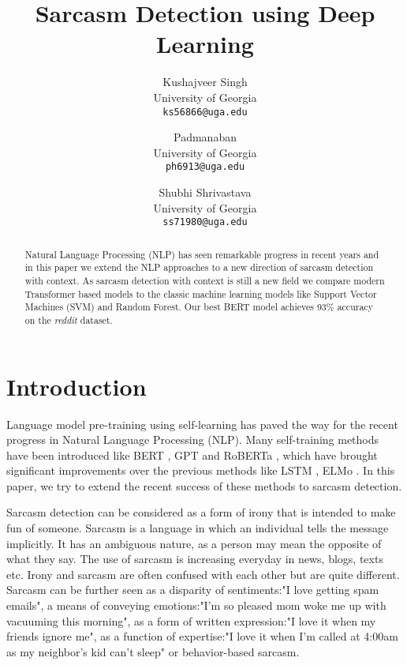 \documentclass[10pt,twocolumn,letterpaper]{article}
\begin{document}
\title{Sarcasm Detection using Deep Learning}
\author{
    Kushajveer Singh\\
    University of Georgia\\
    {\tt\small ks56866@uga.edu}
    \and
    Padmanaban\\
    University of Georgia\\
    {\tt\small ph6913@uga.edu}
    \and
    Shubhi Shrivastava\\
    University of Georgia\\
    {\tt\small ss71980@uga.edu}
}
\maketitle

\begin{abstract}
    Natural Language Processing (NLP) has seen remarkable progress in recent years and in this paper we extend the NLP approaches to a new direction of sarcasm detection with context. As sarcasm detection with context is still a new field we compare modern Transformer based models to the classic machine learning models like Support Vector Machines (SVM) and Random Forest. Our best BERT model achieves 93\% accuracy on the \textit{reddit} dataset.
\end{abstract}

\section{Introduction}
\label{sec:intro}

Language model pre-training using self-learning has paved the way for the recent progress in Natural Language Processing (NLP). Many self-training methods have been introduced like BERT \cite{paper_01}, GPT \cite{paper_02} and RoBERTa \cite{paper_03}, which have brought significant improvements over the previous methods like LSTM \cite{paper_04}, ELMo \cite{paper_05}. In this paper, we try to extend the recent success of these methods to sarcasm detection.

Sarcasm detection can be considered as a form of irony that is intended to make fun of someone. Sarcasm is a language in which an individual tells the message implicitly. It has an ambiguous nature, as a person may mean the opposite of what they say. The use of sarcasm is increasing everyday in news, blogs, texts etc. Irony and sarcasm are often confused with each other but are quite different. Sarcasm can be further seen as a disparity of sentiments:"I love getting spam emails", a means of conveying emotions:"I'm so pleased mom woke me up with vacuuming this morning", as a form of written expression:"I love it when my friends ignore me", as a function of expertise:"I love it when I'm called at 4:00am as my neighbor's kid can't sleep" or behavior-based sarcasm. 
\end{document}
